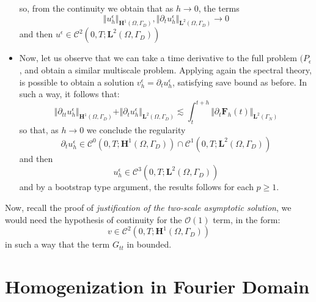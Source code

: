 \begin{itemize}
\begin{equation*}
    \end{equation*}
    so, from the continuity we obtain that as $h \rightarrow 0$, the terms 
    \begin{equation*}
        \Vert u_h^{\epsilon} \Vert_{\mathbf{H}^1(\Omega, \Gamma_D)}, \Vert \partial_t u_h^{\epsilon} \Vert_{\mathbf{L}^2 (\Omega, \Gamma_D)} \rightarrow 0
    \end{equation*}
    and then $u^{\epsilon} \in \mathcal{C}^2(0,T; \mathbf{L}^2(\Omega, \Gamma_D))$
    \item Now, let us observe that we can take a time derivative to the full problem $(P_{\epsilon}$, and obtain a similar multiscale problem. Applying again the spectral theory, is possible to obtain a solution $v_h^{\epsilon} = \partial_t u_h^{\epsilon}$, satisfying save bound as before. In such a way, it follows that:
    \begin{equation*}
        \Vert \partial_{tt} u_h^{\epsilon} \Vert_{\mathbf{H}^1(\Omega, \Gamma_D)} + \Vert \partial_t u_h^{\epsilon} \Vert_{\mathbf{L}^2 (\Omega, \Gamma_D)} \lesssim \int_t^{t+h} \Vert \partial_t \mathbf{F}_h(t) \Vert_{\mathbf{L}^2(\Gamma_N)}
    \end{equation*}
    so that, as $h \rightarrow 0$ we conclude the regularity
    \begin{equation*}
        \partial_t u_h^{\epsilon} \in \mathcal{C}^0(0,T;\mathbf{H}^1(\Omega, \Gamma_D)) \cap \mathcal{C}^1(0,T;\mathbf{L}^2(\Omega, \Gamma_D)) 
    \end{equation*}
    and then
    \begin{equation*}
        u_h^{\epsilon} \in \mathcal{C}^3(0,T; \mathbf{L}^2(\Omega, \Gamma_D))
    \end{equation*}
    and by a bootstrap type argument, the results follows for each $p \geq 1$.
\end{itemize}
\begin{rem}
Now, recall the proof of \textit{justification of the two-scale asymptotic solution}, we would need the hypothesis of continuity for the $\mathcal{O}(1)$ term, in the form:
\begin{equation*}
    v \in \mathcal{C}^2(0,T; \mathbf{H}^1(\Omega, \Gamma_D))
\end{equation*}
in such a way that the term $G_{tt}$ in bounded.
\end{rem}



\section{Homogenization in Fourier Domain}

